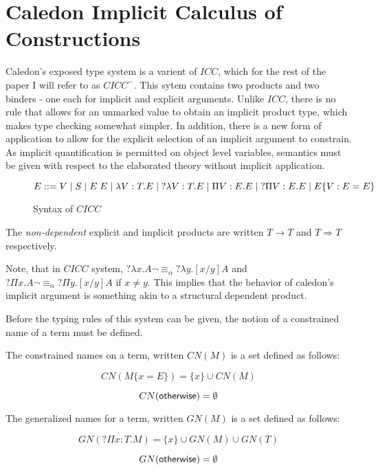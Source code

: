 \section{Caledon Implicit Calculus of Constructions}

Caledon's exposed type system is a varient of $ICC$,
which for the rest of the paper I will refer to as $CICC^{-}$.  
This sytem contains two products and two binders - one each for implicit and explicit arguments. 
Unlike $ICC$, there is no rule that allows for an unmarked value to obtain an implicit product type, which
makes type checking somewhat simpler.  
In addition, there is a new form of application to allow for the explicit
selection of an implicit argument to constrain. 
As implicit quantification is permitted on object level variables, semantics must be given with respect to 
the elaborated theory without implicit application.

\begin{figure}[H]
\[ 
E ::= 
V 
\; | \; S 
\; | \; E\;E 
\; | \; \lambda V : T. E 
\; | \; ?\lambda V : T. E 
\; | \; \Pi V : E . E 
\; | \; ?\Pi V : E . E 
\; | \; E \{ V : E = E \}
\]

\caption{Syntax of $CICC$}
\label{cicc:syntax}
\end{figure}

The \textit{non-dependent} explicit and implicit products are written $T \rightarrow T$ 
and $T \Rightarrow T$ respectively.

Note, that in $CICC$ system, $?\lambda x . A \neg\equiv_\alpha ?\lambda y . [x / y] A$ 
and $?\Pi x . A \neg\equiv_\alpha ?\Pi y . [x / y] A$  if $x \neq y$.  
This implies that the behavior of caledon's implicit argument is something akin to a structural dependent product.  

Before the typing rules of this system can be given, the notion of a constrained name of a term must be defined.

\begin{definition}
The constrained names on a term, written $CN(M)$ is a set defined as follows:

\[
CN(M \{ x = E \}) = \{ x \} \cup CN(M)
\]

\[ 
CN(\mathsf{otherwise}) = \emptyset
\]

\end{definition}

\begin{definition}
The generalized names for a term, written $GN(M)$ is a set defined as follows:

\[ 
GN(?\Pi x : T . M) = \{ x \} \cup GN(M) \cup GN(T)
\]

\[ 
GN(\mathsf{otherwise}) = \emptyset
\]

\end{definition}

